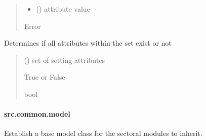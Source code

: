 \documentclass[letterpaper,10pt,english]{sphinxmanual}
\begin{document}
\begin{fulllineitems}
\begin{fulllineitems}
\begin{quote}
\begin{description}
\begin{itemize}
\item {} 
\sphinxAtStartPar
{} () \textendash{} attribute value

\end{itemize}

\sphinxAtStartPar
{} \textendash{} Error

\end{description}\end{quote}

\end{fulllineitems}


\begin{fulllineitems}
\label{\detokenize{src.common.config_setup:src.common.config_setup.Config_settings._has_all_attributes}}
\pysigstartsignatures
\pysiglinewithargsret
{}
{}
{}
\pysigstopsignatures
\sphinxAtStartPar
Determines if all attributes within the set exist or not
\begin{quote}\begin{description}
\sphinxAtStartPar
{} () \textendash{} set of setting attributes

\sphinxAtStartPar
True or False

\sphinxAtStartPar
bool

\end{description}\end{quote}

\end{fulllineitems}


\end{fulllineitems}


\sphinxstepscope


\paragraph{src.common.model}
\label{\detokenize{src.common.model:module-src.common.model}}\label{\detokenize{src.common.model:src-common-model}}\label{\detokenize{src.common.model::doc}}
\sphinxAtStartPar
Establish a base model class for the sectoral modules to inherit.
\end{document}
